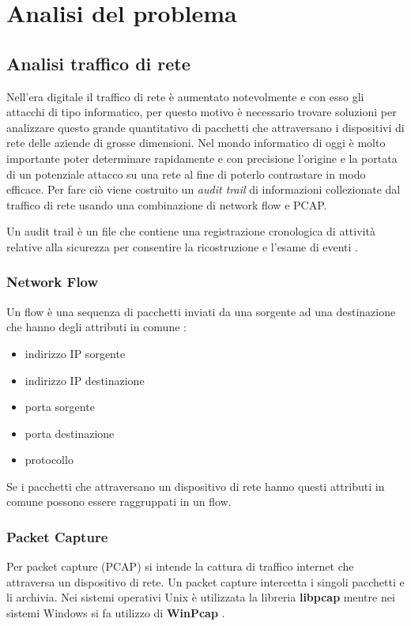 \documentclass[../main.tex]{subfiles}
\begin{document}
\chapter{Analisi del problema}

\section{Analisi traffico di rete}

Nell'era digitale il traffico di rete è aumentato notevolmente e con esso gli attacchi di tipo informatico, per questo motivo è necessario trovare soluzioni per analizzare questo grande quantitativo di pacchetti che attraversano i dispositivi di rete delle aziende di grosse dimensioni. Nel mondo informatico di oggi è molto importante poter determinare rapidamente e con precisione l'origine e la portata di un potenziale attacco su una rete al fine di poterlo contrastare in modo efficace.
Per fare ciò viene costruito un \textit{audit trail} di informazioni collezionate dal traffico di rete usando una combinazione di network flow e PCAP.

Un audit trail è un file che contiene una registrazione cronologica di attività relative alla sicurezza per consentire la ricostruzione e l'esame di eventi \cite{auditTrail}.

\subsection{Network Flow}
Un flow è una sequenza di pacchetti inviati da una sorgente ad una destinazione che hanno degli attributi in comune \cite{trafficflow}:
\begin{itemize}
				\item indirizzo IP sorgente
				\item indirizzo IP destinazione
				\item porta sorgente
				\item porta destinazione
				\item protocollo
\end{itemize}

Se i pacchetti che attraversano un dispositivo di rete hanno questi attributi in comune possono essere raggruppati in un flow.

\subsection{Packet Capture}
Per packet capture (PCAP) si intende la cattura di traffico internet che attraversa un dispositivo di rete. Un packet capture intercetta i singoli pacchetti e li archivia. Nei sistemi operativi Unix è utilizzata la libreria \textbf{libpcap} mentre nei sistemi Windows si fa utilizzo di \textbf{WinPcap} \cite{pcap}.
\end{document}
